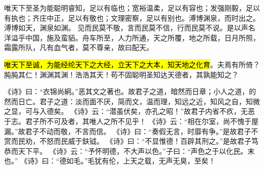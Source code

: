 唯天下至圣为能聪明睿知，足以有临也；宽裕温柔，足以有容也；发强刚毅，足以有执也；齐庄中正，足以有敬也；文理密察，足以有别也。溥博渊泉，而时出之。溥博如天，渊泉如渊。
见而民莫不敬，言而民莫不信，行而民莫不说。是以声名洋溢乎中国，施及蛮貊。舟车所至，人力所通，天之所覆，地之所载，日月所照，霜露所队，凡有血气者，莫不尊亲，故曰配天。

\hl{唯天下至诚，为能经纶天下之大经，立天下之大本，知天地之化育}。夫焉有所倚？肫肫其仁！渊渊其渊！浩浩其天！苟不固聪明圣知达天德者，其孰能知之？

《诗》曰：“衣锦尚絅。”恶其文之著也。故君子之道，暗然而日章；小人之道，的然而日亡。君子之道：淡而面不厌，简而文，温而理，知远之近，知风之自，知微之显，可与入德矣。
《诗》云：“潜虽伏矣，亦孔之昭！”故君子内省不疚，无恶于志。君子所不可及者，其唯人之所不见乎！
《诗》云：“相在尔室，尚不愧于屋漏。”故君子不动而敬，不言而信。
《诗》曰：“奏假无言，时靡有争。”是故君子不赏而民劝，不怒而民威于鈇钺。
《诗》曰：“不显惟德！百辟其刑之。”是故君子笃恭而天下平。
《诗》云：“予怀明德，不大声以色。”子曰：“声色之于以化民。末也。”
《诗》曰：“德如毛。”毛犹有伦，上天之载，无声无臭，至矣！
